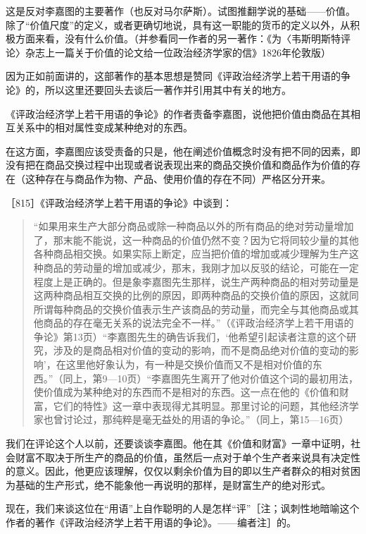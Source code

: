 这是反对李嘉图的主要著作（也反对马尔萨斯）。试图推翻学说的基础——价值。除了“价值尺度”的定义，或者更确切地说，具有这一职能的货币的定义以外，从积极方面来看，没有什么价值。（并参看同一作者的另一著作：《为〈韦斯明斯特评论〉杂志上一篇关于价值的论文给一位政治经济学家的信》1826年伦敦版）

因为正如前面讲的，这部著作的基本思想是赞同《评政治经济学上若干用语的争论》的，所以这里还要回头去谈后一著作并引用其中有关的地方。

《评政治经济学上若干用语的争论》的作者责备李嘉图，说他把价值由商品在其相互关系中的相对属性变成某种绝对的东西。

在这方面，李嘉图应该受责备的只是，他在阐述价值概念时没有把不同的因素，即没有把在商品交换过程中出现或者说表现出来的商品交换价值和商品作为价值的存在（这种存在与商品作为物、产品、使用价值的存在不同）严格区分开来。

［815］《评政治经济学上若干用语的争论》中谈到：

\begin{quote}{“如果用来生产大部分商品或除一种商品以外的所有商品的绝对劳动量增加了，那末能不能说，这一种商品的价值仍然不变？因为它将同较少量的其他各种商品相交换。如果实际上断定，应当把价值的增加或减少理解为生产这种商品的劳动量的增加或减少，那末，我刚才加以反驳的结论，可能在一定程度上是正确的。但是象李嘉图先生那样，说生产两种商品的相对劳动量是这两种商品相互交换的比例的原因，即两种商品的交换价值的原因，这就同所谓每种商品的交换价值表示生产该商品的劳动量，而完全与其他商品或其他商品的存在毫无关系的说法完全不一样。”（《评政治经济学上若干用语的争论》第13页）“李嘉图先生的确告诉我们，‘他希望引起读者注意的这个研究，涉及的是商品相对价值的变动的影响，而不是商品绝对价值的变动的影响’，在这里他好象认为，有一种是交换价值而又不是相对价值的东西。”（同上，第9—10页）“李嘉图先生离开了他对价值这个词的最初用法，使价值成为某种绝对的东西而不是相对的东西。这一点在他的《价值和财富，它们的特性》这一章中表现得尤其明显。那里讨论的问题，其他经济学家也曾讨论过，那纯粹是毫无益处的用语的争论。”（同上，第15—16页）}\end{quote}

我们在评论这个人以前，还要谈谈李嘉图。他在其《价值和财富》一章中证明，社会财富不取决于所生产的商品的价值，虽然后一点对于单个生产者来说具有决定性的意义。因此，他更应该理解，仅仅以剩余价值为目的即以生产者群众的相对贫困为基础的生产形式，绝不能象他一再说明的那样，是财富生产的绝对形式。

现在，我们来谈这位在“用语”上自作聪明的人是怎样“评”［注；讽刺性地暗喻这个作者的著作《评政治经济学上若干用语的争论》。——编者注］的。


